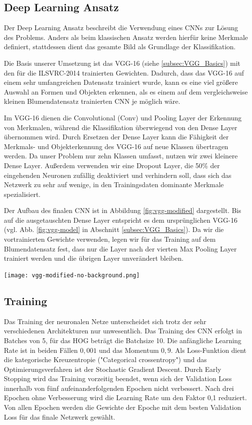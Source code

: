 \documentclass[11pt,a4paper]{article}
\begin{document}
\subsection{Deep Learning Ansatz}
Der Deep Learning Ansatz beschreibt die Verwendung eines CNNs zur Lösung des Problems. Anders als beim klassischen Ansatz werden hierfür keine Merkmale definiert, stattdessen dient das gesamte Bild als Grundlage der Klassifikation.

Die Basis unserer Umsetzung ist das VGG-16 (siehe \ref{subsec:VGG_Basics}) mit den für die ILSVRC-2014 trainierten Gewichten. Dadurch, dass das VGG-16 auf einem sehr umfangreichen Datensatz trainiert wurde, kann es eine viel größere Auswahl an Formen und Objekten erkennen, als es einem auf dem vergleichsweise kleinen Blumendatensatz trainierten CNN je möglich wäre.

Im VGG-16 dienen die Convolutional (Conv) und Pooling Layer der Erkennung von Merkmalen, während die Klassifikation überwiegend von den Dense Layer übernommen wird. Durch Ersetzen der Dense Layer kann die Fähigkeit der Merkmals- und Objekterkennung des VGG-16 auf neue Klassen übertragen werden. Da unser Problem nur zehn Klassen umfasst, nutzen wir zwei kleinere Dense Layer. Außerdem verwenden wir eine Dropout Layer, die 50\% der eingehenden Neuronen zufällig deaktiviert und verhindern soll, dass sich das Netzwerk zu sehr auf wenige, in den Trainingsdaten dominante Merkmale spezialisiert.

Der Aufbau des finalen CNN ist in Abbildung \ref{fig:vgg-modified} dargestellt. Bis auf die ausgetauschten Dense Layer entspricht es dem ursprünglichen VGG-16 (vgl. Abb. \ref{fig:vgg-model} in Abschnitt \ref{subsec:VGG_Basics}). Da wir die vortrainierten Gewichte verwenden, legen wir für das Training auf dem Blumendatensatz fest, dass nur die Layer nach der vierten Max Pooling Layer trainiert werden und die übrigen Layer unverändert bleiben.
\\

\begin{minipage}{.91\linewidth}
	\texttt{[image: vgg-modified-no-background.png]}
	\label{fig:vgg-modified}
\end{minipage}

\subsection{Training}
Das Training der neuronalen Netze unterscheidet sich trotz der sehr verschiedenen Architekturen nur unwesentlich. Das Training des CNN erfolgt in Batches von 5, für das HOG beträgt die Batchsize 10. Die anfängliche Learning Rate ist in beiden Fällen $0,001$ und das Momentum $0,9$. Als Loss-Funktion dient die kategorische Kreuzentropie ("Categorical crossentropy") und das Optimierungsverfahren ist der Stochastic Gradient Descent. Durch Early Stopping wird das Training vorzeitig beendet, wenn sich der Validation Loss innerhalb von fünf aufeinanderfolgenden Epochen nicht verbessert. Nach drei Epochen ohne Verbesserung wird die Learning Rate um den Faktor 0,1 reduziert. Von allen Epochen werden die Gewichte der Epoche mit dem besten Validation Loss für das finale Netzwerk gewählt.
\end{document}
